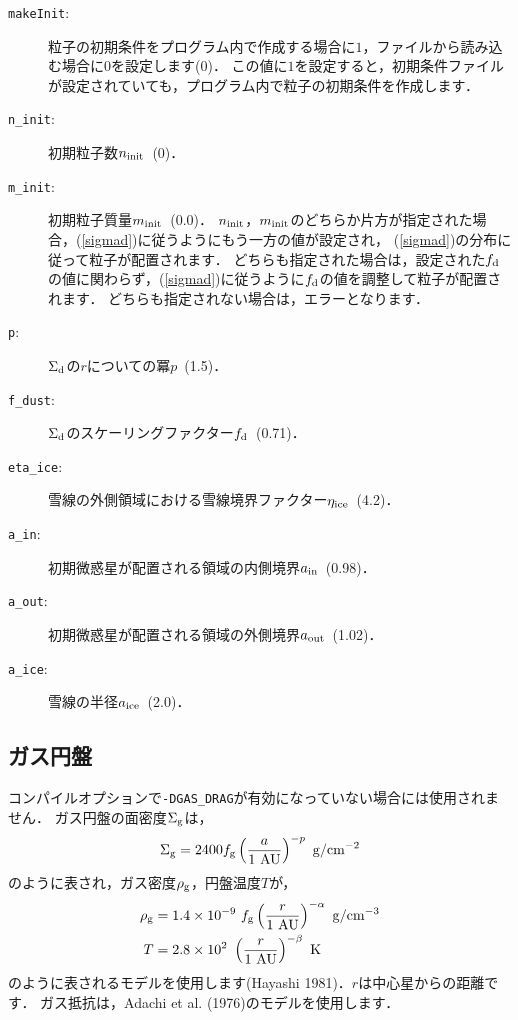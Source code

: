 \documentclass[12pt,a4paper,dvipdfmx]{jsarticle}
\begin{document}
\begin{description}
\item[\texttt{makeInit}:]
粒子の初期条件をプログラム内で作成する場合に$1$，ファイルから読み込む場合に$0$を設定します(0)．
この値に$1$を設定すると，初期条件ファイルが設定されていても，プログラム内で粒子の初期条件を作成します．

\item[\texttt{n\_init}:]
初期粒子数$n_{\rm init}$\ (0)．
\item[\texttt{m\_init}:]
初期粒子質量$m_{\rm init}$\ (0.0)．
$n_{\rm init}$，$m_{\rm init}$のどちらか片方が指定された場合，(\ref{sigmad})に従うようにもう一方の値が設定され，
(\ref{sigmad})の分布に従って粒子が配置されます．
どちらも指定された場合は，設定された$f_{\rm d}$の値に関わらず，(\ref{sigmad})に従うように$f_{\rm d}$の値を調整して粒子が配置されます．
どちらも指定されない場合は，エラーとなります．

\item[\texttt{p}:]
$\Sigma_{\rm d}$の$r$についての冪$p$\ (1.5)．
\item[\texttt{f\_dust}:]
$\Sigma_{\rm d}$のスケーリングファクター$f_{\rm d}$\ (0.71)．
\item[\texttt{eta\_ice}:]
雪線の外側領域における雪線境界ファクター$\eta_{\rm ice}$\ (4.2)．
\item[\texttt{a\_in}:]
初期微惑星が配置される領域の内側境界$a_{\rm in}$\ (0.98)．
\item[\texttt{a\_out}:]
初期微惑星が配置される領域の外側境界$a_{\rm out}$\ (1.02)．
\item[\texttt{a\_ice}:]
雪線の半径$a_{\rm ice}$\ (2.0)．
\end{description}

\subsection{ガス円盤}
コンパイルオプションで\texttt{-DGAS\_DRAG}が有効になっていない場合には使用されません．
ガス円盤の面密度$\Sigma_{\rm g}$は，
\begin{equation}
\Sigma_{\rm g}=2400f_{\rm g}\left( \frac{a}{1\ {\rm AU}} \right)^{-p}\ {\rm g/cm^{-2}}\label{sigmag}
\end{equation}
のように表され，ガス密度$\rho_{\rm g}$，円盤温度$T$が，
\begin{align}
\rho_{\rm g}&=1.4\times 10^{-9}\ f_{\rm g}\left( \frac{r}{1\ {\rm AU}} \right)^{-\alpha}\ {\rm g/cm^{-3}}\\
T&=2.8\times 10^{2}\ \left( \frac{r}{1\ {\rm AU}} \right)^{-\beta}\ {\rm K}
\end{align}
のように表されるモデルを使用します(Hayashi 1981)．$r$は中心星からの距離です．
ガス抵抗は，Adachi et al. (1976)のモデルを使用します．
\end{document}
